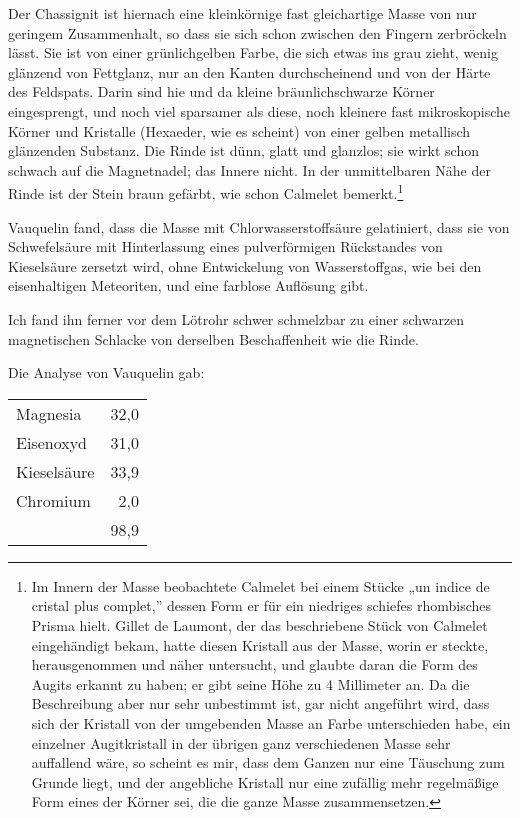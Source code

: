 \documentclass[a4paper, 11pt, oneside]{article}
\begin{document}
Der Chassignit ist hiernach eine kleinkörnige fast gleichartige Masse von nur geringem Zusammenhalt, so dass sie sich schon zwischen den Fingern zerbröckeln lässt. Sie ist von einer grünlichgelben Farbe, die sich etwas ins grau zieht, wenig glänzend von Fettglanz, nur an den Kanten durchscheinend und von der Härte des Feldspats. Darin sind hie und da kleine bräunlichschwarze Körner eingesprengt, und noch viel sparsamer als diese, noch kleinere fast mikroskopische Körner und Kristalle (Hexaeder, wie es scheint) von einer gelben metallisch glänzenden Substanz. Die Rinde ist dünn, glatt und glanzlos; sie wirkt schon schwach auf die Magnetnadel; das Innere nicht. In der unmittelbaren Nähe der Rinde ist der Stein braun gefärbt, wie schon Calmelet bemerkt.\footnote{Im Innern der Masse beobachtete Calmelet bei einem Stücke „un indice de cristal plus complet,” dessen Form er für ein niedriges schiefes rhombisches Prisma hielt. Gillet de Laumont, der das beschriebene Stück von Calmelet eingehändigt bekam, hatte diesen Kristall aus der Masse, worin er steckte, herausgenommen und näher untersucht, und glaubte daran die Form des Augits erkannt zu haben; er gibt seine Höhe zu 4 Millimeter an. Da die Beschreibung aber nur sehr unbestimmt ist, gar nicht angeführt wird, dass sich der Kristall von der umgebenden Masse an Farbe unterschieden habe, ein einzelner Augitkristall in der übrigen ganz verschiedenen Masse sehr auffallend wäre, so scheint es mir, dass dem Ganzen nur eine Täuschung zum Grunde liegt, und der angebliche Kristall nur eine zufällig mehr regelmäßige Form eines der Körner sei, die die ganze Masse zusammensetzen.}

Vauquelin fand, dass die Masse mit Chlorwasserstoffsäure gelatiniert, dass sie von Schwefelsäure mit Hinterlassung eines pulverförmigen Rückstandes von Kieselsäure zersetzt wird, ohne Entwickelung von Wasserstoffgas, wie bei den eisenhaltigen Meteoriten, und eine farblose Auflösung gibt.

Ich fand ihn ferner vor dem Lötrohr schwer schmelzbar zu einer schwarzen magnetischen Schlacke von derselben Beschaffenheit wie die Rinde.

Die Analyse von Vauquelin gab:  
\begin{center}
\begin{tabular}{ l r }
    Magnesia & 32,0\\
    Eisenoxyd & 31,0\\
    Kieselsäure & 33,9\\
    Chromium & 2,0\\
     & 98,9\\
\end{tabular}
\end{center}
\end{document}
